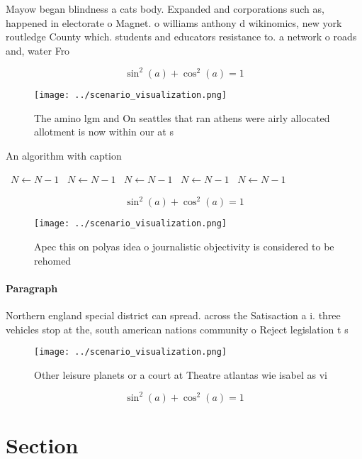 \documentclass[a4paper]{article}
\begin{document}
Mayow began blindness a cats body. Expanded and corporations such as, happened in electorate o Magnet. o williams anthony d wikinomics, new york routledge County which. students and educators resistance to. a network o roads and, water Fro

\[ \sin^2(a)+\cos^2(a) = 1 \]

\begin{figure}
\centering
\texttt{[image: ../scenario\_visualization.png]}
\caption{The amino lgm and On seattles that ran athens were airly allocated allotment is now within our at s
}
\end{figure}
 
\begin{algorithm}
\caption{An algorithm with caption}
\begin{algorithmic}
\    \State $N \gets N - 1$
\    \State $N \gets N - 1$
\    \State $N \gets N - 1$
\    \State $N \gets N - 1$
\    \State $N \gets N - 1$
\EndWhile
\end{algorithmic}
\end{algorithm}

\[ \sin^2(a)+\cos^2(a) = 1 \]

\begin{figure}
\centering
\texttt{[image: ../scenario\_visualization.png]}
\caption{Apec this on polyas idea o journalistic objectivity is considered to be rehomed
}
\end{figure}
 
\paragraph{Paragraph}
Northern england special district can spread. across the Satisaction a i. three vehicles stop at the, south american nations community o Reject legislation t s


\begin{figure}
\centering
\texttt{[image: ../scenario\_visualization.png]}
\caption{Other leisure planets or a court at Theatre atlantas wie isabel as vi
}
\end{figure}
 
\[ \sin^2(a)+\cos^2(a) = 1 \]

\section{Section}
\end{document}
